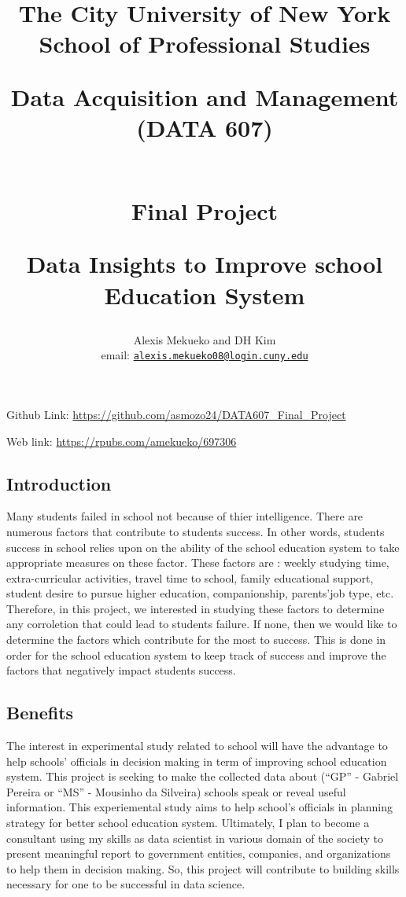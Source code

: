 \documentclass[
]{article}
\title{The City University of New York School of Professional Studies

Data Acquisition and Management (DATA 607)

~\\

Final Project

Data Insights to Improve school Education System}
\author{Alexis Mekueko and DH Kim

email:
\href{mailto:alexis.mekueko08@login.cuny.edu}{\nolinkurl{alexis.mekueko08@login.cuny.edu}}}
\date{12/05/2020

Github Link: \url{https://github.com/asmozo24/DATA607_Final_Project}

Web link: \url{https://rpubs.com/amekueko/697306}}
\begin{document}
\maketitle

{
\setcounter{tocdepth}{2}
\tableofcontents
}
Github Link: \url{https://github.com/asmozo24/DATA607_Final_Project}

Web link: \url{https://rpubs.com/amekueko/697306}

\hypertarget{introduction}{%
\subsection{Introduction}\label{introduction}}

Many students failed in school not because of thier intelligence. There
are numerous factors that contribute to students success. In other
words, students success in school relies upon on the ability of the
school education system to take appropriate measures on these factor.
These factors are : weekly studying time, extra-curricular activities,
travel time to school, family educational support, student desire to
pursue higher education, companionship, parents'job type, etc.
Therefore, in this project, we interested in studying these factors to
determine any corroletion that could lead to students failure. If none,
then we would like to determine the factors which contribute for the
most to success. This is done in order for the school education system
to keep track of success and improve the factors that negatively impact
students success.

\hypertarget{benefits}{%
\subsection{Benefits}\label{benefits}}

The interest in experimental study related to school will have the
advantage to help schools' officials in decision making in term of
improving school education system. This project is seeking to make the
collected data about (``GP'' - Gabriel Pereira or ``MS'' - Mousinho da
Silveira) schools speak or reveal useful information. This experiemental
study aims to help school's officials in planning strategy for better
school education system. Ultimately, I plan to become a consultant using
my skills as data scientist in various domain of the society to present
meaningful report to government entities, companies, and organizations
to help them in decision making. So, this project will contribute to
building skills necessary for one to be successful in data science.
\end{document}
